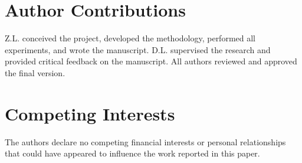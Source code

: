 \documentclass[11pt]{article}
\begin{document}
\section*{Author Contributions}
Z.L. conceived the project, developed the methodology, performed all experiments, and wrote the manuscript. D.L. supervised the research and provided critical feedback on the manuscript. All authors reviewed and approved the final version.

\section*{Competing Interests}
The authors declare no competing financial interests or personal relationships that could have appeared to influence the work reported in this paper.

\end{document}
